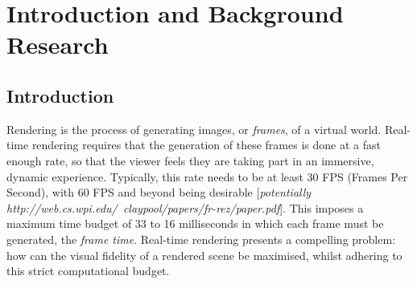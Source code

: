 \chapter{Introduction and Background Research}

\label{chapter1}


\section{Introduction}

Rendering is the process of generating images, or \textit{frames}, of a virtual world. Real-time rendering requires that the generation of these frames is done at a fast enough rate, so that the viewer feels they are taking part in an immersive, dynamic experience. Typically, this rate needs to be at least 30 FPS (Frames Per Second), with 60 FPS and beyond being desirable [\textit{potentially http://web.cs.wpi.edu/~claypool/papers/fr-rez/paper.pdf}]. This imposes a maximum time budget of 33 to 16 milliseconds in which each frame must be generated, the \textit{frame time}. Real-time rendering presents a compelling problem: how can the visual fidelity of a rendered scene be maximised, whilst adhering to this strict computational budget.

